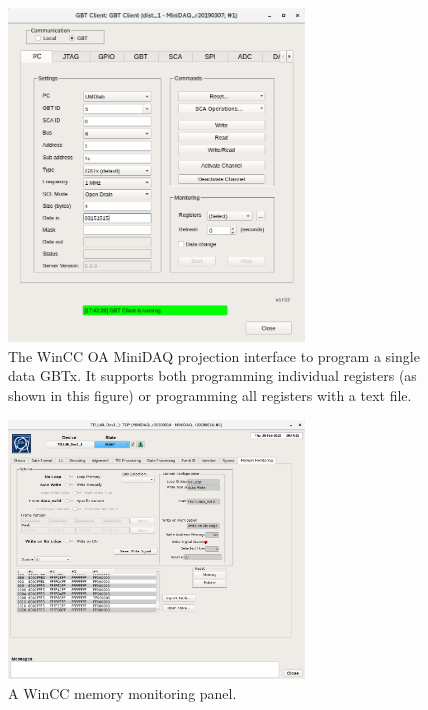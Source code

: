 \begin{figure}[!htb]
    \centering
    \includegraphics[width=0.7\textwidth]{./figs-ut-upgrade/online/gbt_client_slave_gbt_i2c_test.png}
    \caption{
        The WinCC OA MiniDAQ projection interface to program a single data GBTx.
        It supports both programming individual registers (as shown in this
        figure) or programming all registers with a text file.
    }
    \label{fig:wincc-oa-gbt}
\end{figure}

\begin{figure}[!htb]
    \centering
    \includegraphics[width=0.7\textwidth]{./figs-ut-upgrade/online/memory_monitoring_panel.png}
    \caption{
        A WinCC memory monitoring panel.
    }
    \label{fig:wincc-oa-memmon}
\end{figure}


